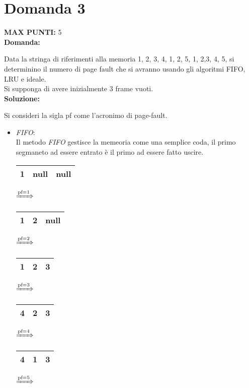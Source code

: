 \documentclass{article}
\begin{document}
    \section*{Domanda 3}
    \textbf{MAX PUNTI:} 5\\
    \textbf{Domanda:}


    Data la stringa di riferimenti alla memoria 1, 2, 3, 4, 1, 2, 5, 1, 2,3, 4, 5, si determinino il numero di page fault che si avranno usando gli algoritmi FIFO, LRU e ideale.\\
    Si supponga di avere inizialmente 3 frame vuoti.\\
    \textbf{Soluzione:}


    Si consideri la sigla pf come l'acronimo di page-fault.
    \begin{itemize}
        \item \emph{FIFO}:\\
            Il metodo \emph{FIFO} gestisce la memeoria come una semplice coda, il primo segmaneto ad essere entrato è il primo ad essere fatto uscire.\\
            \begin{tabular}{|c|c|c|}
                \hline
                1 & null & null\\
                \hline
            \end{tabular}
            $\xRightarrow{\text{pf}=1}$
            \begin{tabular}{|c|c|c|}
                \hline
                1 & 2 & null\\
                \hline
            \end{tabular}
            $\xRightarrow{\text{pf}=2}$
            \begin{tabular}{|c|c|c|}
                \hline
                1 & 2 & 3\\
                \hline
            \end{tabular}
            $\xRightarrow{\text{pf}=3}$
            \begin{tabular}{|c|c|c|}
                \hline
                4 & 2 & 3\\
                \hline
            \end{tabular}
            $\xRightarrow{\text{pf}=4}$
            \begin{tabular}{|c|c|c|}
                \hline
                4 & 1 & 3\\
                \hline
            \end{tabular}
            $\xRightarrow{\text{pf}=5}$

\end{itemize}
\end{document}
